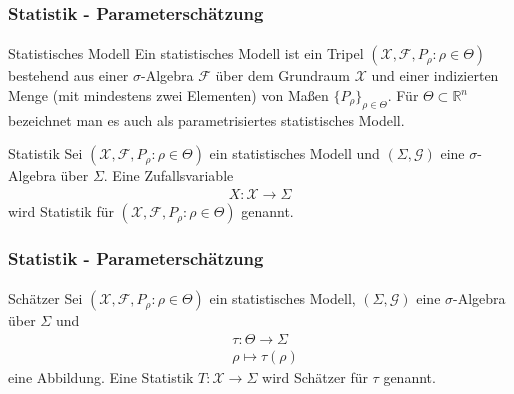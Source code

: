 \documentclass{beamer}
\begin{document}
\begin{frame}
    \frametitle{Statistik - Parameterschätzung}
\framesubtitle{}

\begin{block}{Statistisches Modell}
Ein statistisches Modell ist ein Tripel $(\mathcal{X}, \mathcal{F}, P_\rho :  \rho \in \Theta)$ bestehend aus einer $\sigma$-Algebra $\mathcal{F}$ über dem Grundraum $\mathcal{X}$ und einer indizierten Menge (mit mindestens zwei Elementen) von Maßen $\{ P_\rho\}_{\rho \in \Theta}$. Für $\Theta \subset \mathbb{R}^n$ bezeichnet man es auch als parametrisiertes statistisches Modell. 
\end{block}

\begin{block}{Statistik}
Sei   $(\mathcal{X}, \mathcal{F}, P_\rho :  \rho \in\Theta)$ ein statistisches Modell und $(\Sigma, \mathcal{G})$ eine $\sigma$-Algebra über $\Sigma$. Eine Zufallsvariable 
\begin{align*}
X : \mathcal{X} \to \Sigma
\end{align*}
wird Statistik für  $(\mathcal{X}, \mathcal{F}, P_\rho :  \rho \in \Theta)$  genannt.
\end{block}
 \end{frame}



\begin{frame}
    \frametitle{Statistik - Parameterschätzung}
\framesubtitle{}

\begin{block}{Schätzer}
Sei   $(\mathcal{X}, \mathcal{F}, P_\rho :  \rho \in \Theta)$ ein statistisches Modell, $(\Sigma, \mathcal{G})$ eine $\sigma$-Algebra über $\Sigma$ und  
\begin{align*}
& \tau : \Theta \to \Sigma \\
 & \rho \mapsto \tau(\rho) 
\end{align*}
eine Abbildung. Eine Statistik   $T: \mathcal{X} \to \Sigma$  wird Schätzer für $\tau$ genannt.
\end{block}
 \end{frame}
\end{document}
